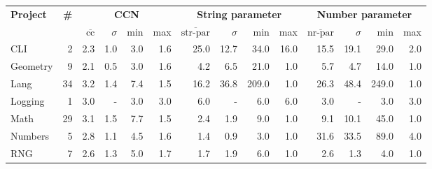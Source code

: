 \begin{tabular}{ l r | r@{\hskip 0.08in}r@{\hskip 0.08in}r@{\hskip 0.08in}r | r@{\hskip 0.08in}r@{\hskip 0.08in}r@{\hskip 0.08in}r | r@{\hskip 0.08in}r@{\hskip 0.08in}r@{\hskip 0.08in}r }
\hline 
\textbf{Project} & \textbf{\#} & \multicolumn{4}{c}{\textbf{CCN}} & \multicolumn{4}{c}{\textbf{String parameter}} & \multicolumn{4}{c}{\textbf{Number parameter}} \\ 
  &   & $\overline{\text{cc}}$ & $\sigma$ & min & max & $\overline{\text{str-par}}$ & $\sigma$ & min & max & $\overline{\text{nr-par}}$ & $\sigma$ & min & max \\ 
\hline 
CLI & 2 &2.3 &1.0 &3.0 & 1.6 &25.0 &12.7 &34.0 & 16.0 &15.5 &19.1 &29.0 & 2.0 \\ 
Geometry & 9 &2.1 &0.5 &3.0 & 1.6 &4.2 &6.5 &21.0 & 1.0 &5.7 &4.7 &14.0 & 1.0 \\ 
Lang & 34 &3.2 &1.4 &7.4 & 1.5 &16.2 &36.8 &209.0 & 1.0 &26.3 &48.4 &249.0 & 1.0 \\ 
Logging & 1 &3.0 &- &3.0 & 3.0 &6.0 &- &6.0 & 6.0 &3.0 &- &3.0 & 3.0 \\ 
Math & 29 &3.1 &1.5 &7.7 & 1.5 &2.4 &1.9 &9.0 & 1.0 &9.1 &10.1 &45.0 & 1.0 \\ 
Numbers & 5 &2.8 &1.1 &4.5 & 1.6 &1.4 &0.9 &3.0 & 1.0 &31.6 &33.5 &89.0 & 4.0 \\ 
RNG & 7 &2.6 &1.3 &5.0 & 1.7 &1.7 &1.9 &6.0 & 1.0 &2.6 &1.3 &4.0 & 1.0 \\ 
\hline 
\end{tabular}